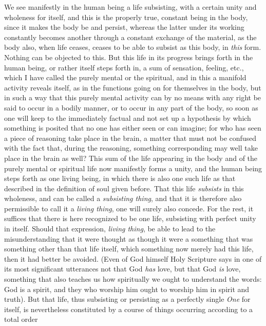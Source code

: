 \documentclass[12pt,a4paper,openany]{book}
\newcommand{\opage}[1]{\marginnote{\footnotesize\textit{[#1]}}}
\begin{document}
We see manifestly in the human being a life subsisting, with a certain unity and
wholeness for itself, and this is the properly true, constant being in the body,
since it makes the body be and persist, whereas the latter under its working
constantly becomes another through a constant exchange of the material, as the body
also, when life ceases, ceases to be able to
\setcounter{footnote}{0}%
\opage{122}subsist as this body, in \emph{this} form. Nothing can be objected to this. But this
life in its progress brings forth in the human being, or rather itself steps forth
in, a sum of sensation, feeling, etc., which I have called the purely mental or the
spiritual, and in this a manifold activity reveals itself, as in the functions going
on for themselves in the body, but in such a way that this purely mental activity can
by no means with any right be said to occur in a bodily manner, or to occur in any
part of the body, so soon as one will keep to the immediately factual and not set up
a hypothesis by which something is posited that no one has either seen or can
imagine; for who has seen a piece of reasoning take place in the brain, a matter
that must not be confused with the fact that, during the reasoning, something
corresponding may well take place in the brain as well? This sum of the life
appearing in the body and of the purely mental or spiritual life now manifestly
forms a unity, and the human being steps forth as one living being, in which there is
also one such life as that described in the definition of soul given before. That
this life \emph{subsists} in this wholeness, and can be called a
\emph{subsisting thing}, and that it is therefore also permissible to call it a
\emph{living thing}, one will surely also concede. For the rest, it suffices that
there is here recognized to be one life, subsisting with perfect unity in itself.
Should that expression, \emph{living thing}, be able to lead to the misunderstanding
that it were thought as though it were a something that was something other than
that life itself, which something now merely had this life, then it had better be
avoided. (Even of God himself Holy Scripture says in one of its most significant
utterances not that God \emph{has} love, but that God \emph{is} love, something that
also teaches us how spiritually we ought to understand the words: God is a spirit,
and they who worship him ought to worship him in spirit and truth). But that life,
thus subsisting or persisting as a perfectly single \emph{One} for itself, is
nevertheless constituted by a course of things occurring according to a total order
\end{document}
